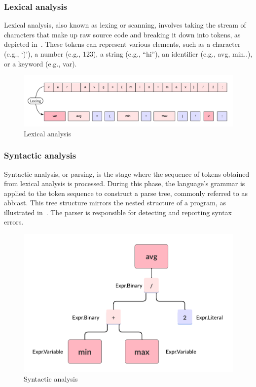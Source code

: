        \subsubsection{Lexical analysis}
            Lexical analysis, also known as lexing or scanning, involves taking the stream of characters that make up raw source code and breaking it down into tokens, as depicted in~. These tokens can represent various elements, such as a character (e.g., ‘)’), a number (e.g., 123), a string (e.g., “hi”), an identifier (e.g., avg, min..), or a keyword (e.g., var).

            \begin{figure}[hbt!]
                \begin{center}
                \includegraphics[width=.9\textwidth]{assets/images/lexing.png}
                \end{center}
                \caption{Lexical analysis}%
                \label{fig:aco:general:lexing}
            \end{figure}


        \subsubsection{Syntactic analysis}            
            Syntactic analysis, or parsing, is the stage where the sequence of tokens obtained from lexical analysis is processed. During this phase, the language's grammar is applied to the token sequence to construct a parse tree, commonly referred to as \gls{abb:ast}. This tree structure mirrors the nested structure of a program, as illustrated in~. The parser is responsible for detecting and reporting syntax errors.

            \begin{figure}[hbt!]
                \begin{center}
                \includegraphics[width=.6\textwidth]{assets/images/ast.png}
                \end{center}
                \caption{Syntactic analysis}
                \label{fig:aco:general:ast}
            \end{figure}


